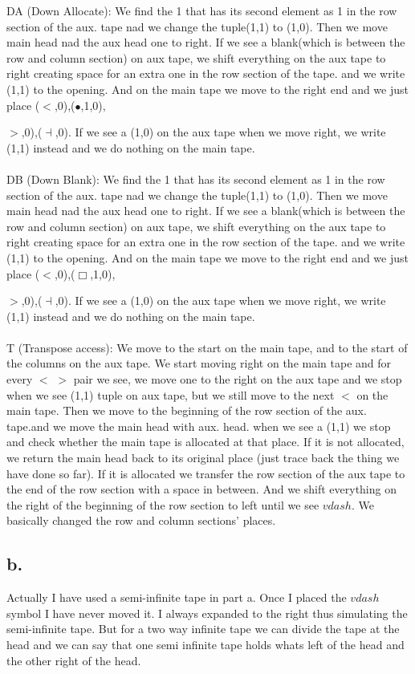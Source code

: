 \documentclass[12pt]{article}
\begin{document}
DA (Down Allocate): We find the 1 that has its second element as 1 in the row section of the aux. tape nad we change the tuple(1,1) to (1,0). Then we move main head nad the aux head one to right. If we see a blank(which is between the row and column section) on aux tape, we shift everything on the aux tape to right creating space for an extra one in the row section of the tape. and we write (1,1) to the opening. And on the main tape we move to the right end and we just place ($<$,0),($\bullet$,1,0),{$>$,0),($\dashv$,0). If we see a (1,0) on the aux tape when we move right, we write (1,1) instead and we do nothing on the main tape.\\
\\
DB (Down Blank): We find the 1 that has its second element as 1 in the row section of the aux. tape nad we change the tuple(1,1) to (1,0). Then we move main head nad the aux head one to right. If we see a blank(which is between the row and column section) on aux tape, we shift everything on the aux tape to right creating space for an extra one in the row section of the tape. and we write (1,1) to the opening. And on the main tape we move to the right end and we just place ($<$,0),($\Box$,1,0),{$>$,0),($\dashv$,0). If we see a (1,0) on the aux tape when we move right, we write (1,1) instead and we do nothing on the main tape.\\
\\
T (Transpose access): We move to the start on the main tape, and to the start of the columns on the aux tape. We start moving right on the main tape and for every $<$ $>$ pair we see, we move one to the right on the aux tape and we stop when we see (1,1) tuple on aux tape, but we still move to the next $<$ on the main tape. Then we move to the beginning of the row section of the aux. tape.and we move the main head with aux. head. when we see a (1,1) we stop and check whether the main tape is allocated at that place. If it is not allocated, we return the main head back to its original place (just trace back the thing we have done so far). If it is allocated we transfer the row section of the aux tape to the end of the row section with a space in between. And we shift everything on the right of the beginning of the row section to left until we see $vdash$. We basically changed the row and column sections' places.\\

\subsection*{b.}
Actually I have used a semi-infinite tape in part a. Once I placed the $vdash$ symbol I have never moved it. I always expanded to the right thus simulating the semi-infinite tape. But for a two way infinite tape we can divide the tape at the head and we can say that one semi infinite tape holds whats left of the head and the other right of the head.
}}
\end{document}
